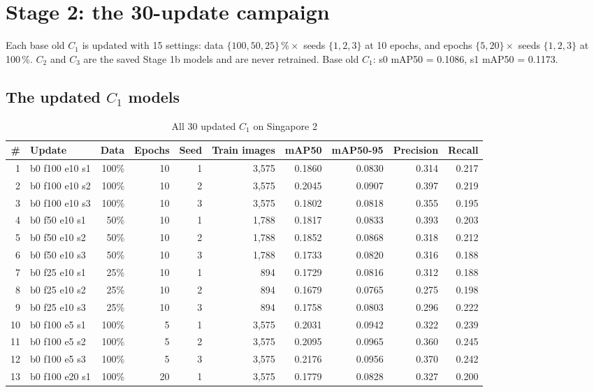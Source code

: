 \documentclass[10pt,a4paper]{article}
\begin{document}
\section{Stage 2: the 30-update campaign}
Each base old $C_1$ is updated with 15 settings: data $\{100, 50, 25\}\,\% \times$ seeds $\{1,2,3\}$ at 10 epochs, and epochs $\{5, 20\} \times$ seeds $\{1,2,3\}$ at 100\,\%.
$C_2$ and $C_3$ are the saved Stage 1b models and are never retrained. Base old $C_1$: s0 mAP50 = 0.1086, s1 mAP50 = 0.1173.

\subsection{The updated $C_1$ models}
\begin{table}[h]\centering\scriptsize\caption{All 30 updated $C_1$ on Singapore 2}
\begin{tabular}{rlrrrrrrrr}\toprule
\# & Update & Data & Epochs & Seed & Train images & mAP50 & mAP50-95 & Precision & Recall\\\midrule
1 & b0 f100 e10 s1 & 100\% & 10 & 1 & 3,575 & 0.1860 & 0.0830 & 0.314 & 0.217\\
2 & b0 f100 e10 s2 & 100\% & 10 & 2 & 3,575 & 0.2045 & 0.0907 & 0.397 & 0.219\\
3 & b0 f100 e10 s3 & 100\% & 10 & 3 & 3,575 & 0.1802 & 0.0818 & 0.355 & 0.195\\
4 & b0 f50 e10 s1 & 50\% & 10 & 1 & 1,788 & 0.1817 & 0.0833 & 0.393 & 0.203\\
5 & b0 f50 e10 s2 & 50\% & 10 & 2 & 1,788 & 0.1852 & 0.0868 & 0.318 & 0.212\\
6 & b0 f50 e10 s3 & 50\% & 10 & 3 & 1,788 & 0.1733 & 0.0820 & 0.316 & 0.188\\
7 & b0 f25 e10 s1 & 25\% & 10 & 1 & 894 & 0.1729 & 0.0816 & 0.312 & 0.188\\
8 & b0 f25 e10 s2 & 25\% & 10 & 2 & 894 & 0.1679 & 0.0765 & 0.275 & 0.198\\
9 & b0 f25 e10 s3 & 25\% & 10 & 3 & 894 & 0.1758 & 0.0803 & 0.296 & 0.222\\
10 & b0 f100 e5 s1 & 100\% & 5 & 1 & 3,575 & 0.2031 & 0.0942 & 0.322 & 0.239\\
11 & b0 f100 e5 s2 & 100\% & 5 & 2 & 3,575 & 0.2095 & 0.0965 & 0.360 & 0.245\\
12 & b0 f100 e5 s3 & 100\% & 5 & 3 & 3,575 & 0.2176 & 0.0956 & 0.370 & 0.242\\
13 & b0 f100 e20 s1 & 100\% & 20 & 1 & 3,575 & 0.1779 & 0.0828 & 0.327 & 0.200\\

\end{tabular}
\end{table}
\end{document}
